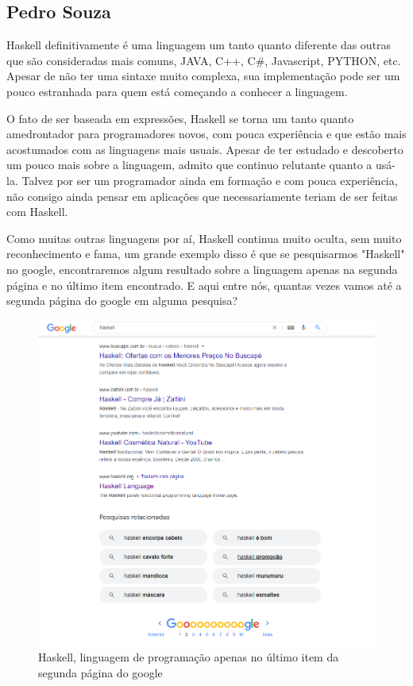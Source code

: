 \documentclass[
  12pt,				         %
  oneside,			       %
  a4paper,			       %
  english,		       	 %
  brazil,			      	 %
]{abntex2}
\begin{document}
\begin{apendicesenv}
        \newpage

        \chapter{Pedro Souza}

        Haskell definitivamente é uma linguagem um tanto quanto diferente das outras que são consideradas mais comuns, JAVA, C++, C\#, Javascript,
        PYTHON, etc. Apesar de não ter uma sintaxe muito complexa, sua implementação pode ser um pouco estranhada para quem está começando a conhecer
        a linguagem. 
    
        O fato de ser baseada em expressões, Haskell se torna um tanto quanto amedrontador para programadores novos, com pouca experiência e que estão
        mais acostumados com as linguagens mais usuais. Apesar de ter estudado e descoberto um pouco mais sobre a linguagem, admito que continuo 
        relutante quanto a usá-la. Talvez por ser um programador ainda em formação e com pouca experiência, não consigo ainda pensar em aplicações 
        que necessariamente teriam de ser feitas com Haskell.
    
        Como muitas outras linguagens por aí, Haskell continua muito oculta, sem muito reconhecimento e fama, um grande exemplo disso é que se pesquisarmos
        "Haskell" no google, encontraremos algum resultado sobre a linguagem apenas na segunda página e no último item encontrado. E aqui entre nós, quantas vezes vamos
        até a segunda página do google em alguma pesquisa?
    
        \begin{figure}[ht]
            \centering 
            \includegraphics[scale=0.3]{Haskellgoogle.png}
            \caption{Haskell, linguagem de programação apenas no último item da segunda página do google}
        \end{figure}

    \end{apendicesenv}


    \printindex
\end{document}
